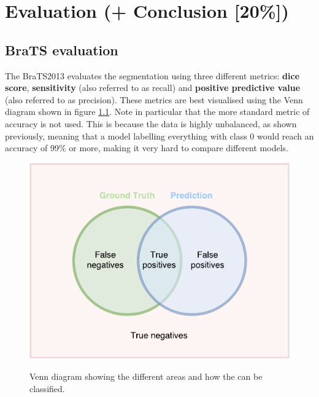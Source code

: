 \documentclass[12pt,a4paper,twoside,openright]{report}
\begin{document}
\chapter{Evaluation (+ Conclusion [20\%])}

\section{BraTS evaluation}
The BraTS2013\cite{brats-proceedings} evaluates the segmentation using three different metrics: \textbf{dice score}, \textbf{sensitivity} (also referred to as recall) and \textbf{positive predictive value} (also referred to as precision). These metrics are best visualised using the Venn diagram shown in figure \ref{fig:evaluation_venn_diagram}.  Note in particular that the more standard metric of accuracy is not used. This is because the data is highly unbalanced, as shown previously, meaning that a model labelling everything with class 0 would reach an accuracy of 99\% or more, making it very hard to compare different models.

\begin{figure}[h]
	\centering
	\includegraphics[scale = 0.5]{evaluation_venn_diagram}
	\label{fig:evaluation_venn_diagram}
	\caption{Venn diagram showing the different areas and how the can be classified.}
\end{figure}
\end{document}
